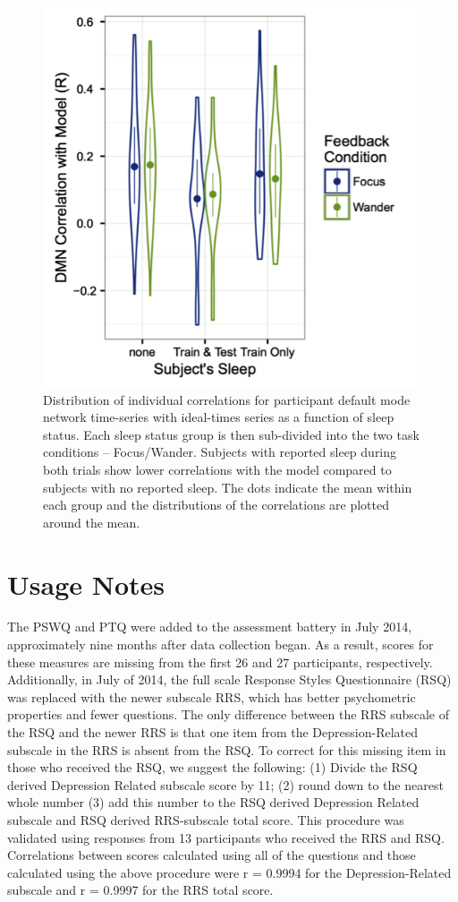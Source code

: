 \begin{figure}[h!]
   \centering
   \includegraphics[]{nfb_perf.png}
   \caption{Distribution of individual correlations for participant default mode network time-series with ideal-times series as a function of sleep status. Each sleep status group is then sub-divided into the two task conditions -- Focus/Wander. Subjects with reported sleep during both trials show lower correlations with the model compared to subjects with no reported sleep. The dots indicate the mean within each group and the distributions of the correlations are plotted around the mean.}
   \label{fig:nfb_perf}
\end{figure}

\section{Usage Notes}
The PSWQ and PTQ were added to the assessment battery in July 2014, approximately nine months after data collection began. As a result, scores for these measures are missing from the first 26 and 27 participants, respectively. Additionally, in July of 2014, the full scale Response Styles Questionnaire (RSQ) was replaced with the newer subscale RRS, which has better psychometric properties and fewer questions. The only difference between the RRS subscale of the RSQ and the newer RRS is that one item from the Depression-Related subscale in the RRS is absent from the RSQ. To correct for this missing item in those who received the RSQ, we suggest the following: (1) Divide the RSQ derived Depression Related subscale score by 11; (2) round down to the nearest whole number (3) add this number to the RSQ derived Depression Related subscale and RSQ derived RRS-subscale total score. This procedure was validated using responses from 13 participants who received the RRS and RSQ. Correlations between scores calculated using all of the questions and those calculated using the above procedure were r = 0.9994 for the Depression-Related subscale and r = 0.9997 for the RRS total score.

